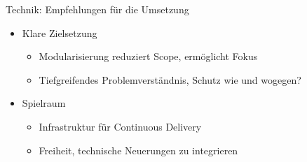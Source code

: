 
\begin{frame}{Technik: Empfehlungen für die Umsetzung}
  \begin{itemize}
    \item Klare Zielsetzung
    \begin{itemize}
      \item Modularisierung reduziert Scope, ermöglicht Fokus
      \item Tiefgreifendes Problemverständnis, Schutz wie und wogegen?
    \end{itemize}
    \item Spielraum
    \begin{itemize}
      \item Infrastruktur für Continuous Delivery
      \item Freiheit, technische Neuerungen zu integrieren
    \end{itemize}

  \end{itemize}
\end{frame}


